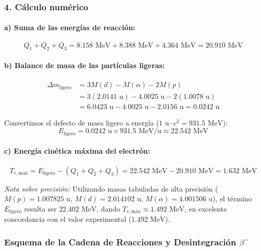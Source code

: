 \begin{problema}
\subsubsection*{4. Cálculo numérico}

\paragraph{a) Suma de las energías de reacción:}
\begin{equation}
Q_1 + Q_2 + Q_3 = 8.158\text{ MeV} + 8.388\text{ MeV} + 4.364\text{ MeV} = 20.910\text{ MeV}
\end{equation}

\paragraph{b) Balance de masa de las partículas ligeras:}
\begin{align}
\Delta m_{\text{ligero}} &= 3 M(d) - M(\alpha) - 2 M(p) \nonumber \\
&= 3(2.0141\text{ u}) - 4.0025\text{ u} - 2(1.0078\text{ u}) \nonumber \\
&= 6.0423\text{ u} - 4.0025\text{ u} - 2.0156\text{ u} = 0.0242\text{ u}
\end{align}

Convertimos el defecto de masa ligero a energía ($1\text{ u} \cdot c^2 = 931.5\text{ MeV}$):
\begin{equation}
E_{\text{ligero}} = 0.0242\text{ u} \times 931.5\text{ MeV/u} \approx 22.542\text{ MeV}
\end{equation}

\paragraph{c) Energía cinética máxima del electrón:}
\begin{equation}
T_{e,\text{máx}} = E_{\text{ligero}} - (Q_1 + Q_2 + Q_3) = 22.542\text{ MeV} - 20.910\text{ MeV} = 1.632\text{ MeV}
\end{equation}

\textit{Nota sobre precisión:} Utilizando masas tabuladas de alta precisión ($M(p)=1.007825\text{ u}$, $M(d)=2.014102\text{ u}$, $M(\alpha)=4.001506\text{ u}$), el término $E_{\text{ligero}}$ resulta ser $22.402\text{ MeV}$, dando $T_{e,\text{máx}} \approx 1.492\text{ MeV}$, en excelente concordancia con el valor experimental ($1.492\text{ MeV}$).

\subsubsection*{Esquema de la Cadena de Reacciones y Desintegración $\beta^-$}


\end{problema}
